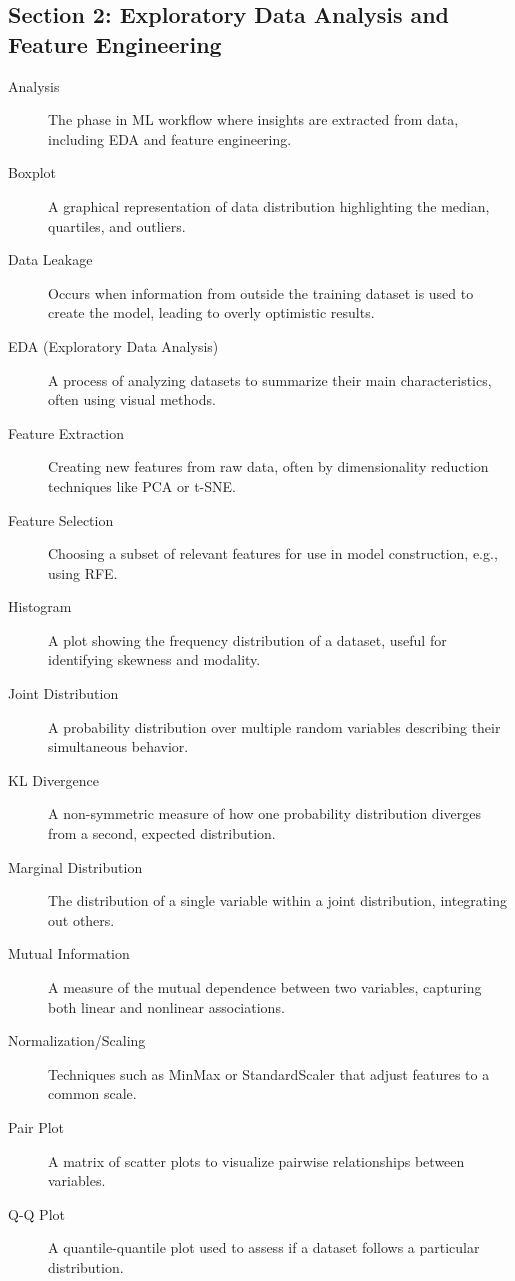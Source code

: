 \documentclass[11pt]{article}
\begin{document}
\subsection{Section 2: Exploratory Data Analysis and Feature Engineering}
\label{sec:org2e7cdec}
\begin{description}
\item[{Analysis}] The phase in ML workflow where insights are extracted from data, including EDA and feature engineering.
\item[{Boxplot}] A graphical representation of data distribution highlighting the median, quartiles, and outliers.
\item[{Data Leakage}] Occurs when information from outside the training dataset is used to create the model, leading to overly optimistic results.
\item[{EDA (Exploratory Data Analysis)}] A process of analyzing datasets to summarize their main characteristics, often using visual methods.
\item[{Feature Extraction}] Creating new features from raw data, often by dimensionality reduction techniques like PCA or t-SNE.
\item[{Feature Selection}] Choosing a subset of relevant features for use in model construction, e.g., using RFE.
\item[{Histogram}] A plot showing the frequency distribution of a dataset, useful for identifying skewness and modality.
\item[{Joint Distribution}] A probability distribution over multiple random variables describing their simultaneous behavior.
\item[{KL Divergence}] A non-symmetric measure of how one probability distribution diverges from a second, expected distribution.
\item[{Marginal Distribution}] The distribution of a single variable within a joint distribution, integrating out others.
\item[{Mutual Information}] A measure of the mutual dependence between two variables, capturing both linear and nonlinear associations.
\item[{Normalization/Scaling}] Techniques such as MinMax or StandardScaler that adjust features to a common scale.
\item[{Pair Plot}] A matrix of scatter plots to visualize pairwise relationships between variables.
\item[{Q-Q Plot}] A quantile-quantile plot used to assess if a dataset follows a particular distribution.

\end{description}
\end{document}
